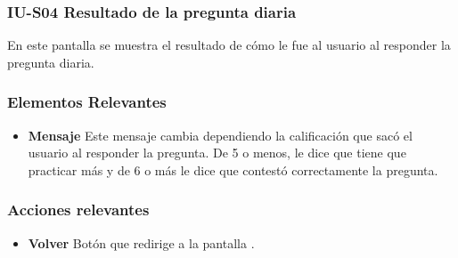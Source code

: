 
\subsubsection{IU-S04  Resultado de la pregunta diaria}

 En este pantalla se muestra el resultado de cómo le fue al usuario al responder la pregunta diaria.


\subsubsection{Elementos Relevantes}

    \begin{itemize}
    \item {\bf Mensaje}
        Este mensaje cambia dependiendo la
        calificación que sacó el usuario al responder la pregunta. De 5 o menos, le dice que tiene que practicar más y de 6 o más le dice que contestó correctamente la pregunta.
    \end{itemize}

\subsubsection{Acciones relevantes}

    \begin{itemize}
    \item {\bf Volver}
        Botón que redirige a la pantalla .
    \end{itemize}

\clearpage
